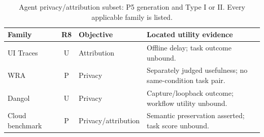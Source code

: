 \begin{table}[ht]\centering\footnotesize
\caption{Agent privacy/attribution subset: P5 generation and Type I or II. Every applicable family is listed.}\label{tab:r34-agent}
\begin{tabularx}{\linewidth}{@{}lclY@{}}\toprule
Family & R8 & Objective & Located utility evidence\\\midrule
UI Traces~\cite{uitraces2026} & U & Attribution & Offline delay; task outcome unbound.\\
WRA~\cite{jeong2026wra} & P & Privacy & Separately judged usefulness; no same-condition task pair.\\
Dangol~\cite{dangol2026workflow} & U & Privacy & Capture/loopback outcome; workflow utility unbound.\\
Cloud benchmark~\cite{pouryousef2026traffic} & P & Privacy/attribution & Semantic preservation asserted; task score unbound.\\
\bottomrule\end{tabularx}\end{table}
